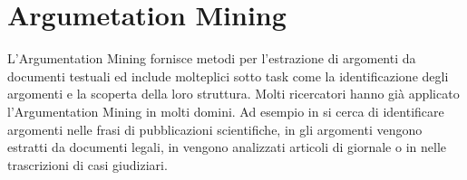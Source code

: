 \section{Argumetation Mining}
L'Argumentation Mining fornisce metodi per l'estrazione di argomenti da documenti testuali ed include molteplici sotto task come la identificazione degli argomenti e la scoperta della loro struttura. Molti ricercatori hanno già applicato l'Argumentation Mining in molti domini. Ad esempio in \cite{teufel1999annotation} si cerca di identificare argomenti nelle frasi di pubblicazioni scientifiche, in \cite{moens2007automatic} gli argomenti vengono estratti da documenti legali, in \cite{feng2011classifying} vengono analizzati articoli di giornale o in \cite{florou2013argument} nelle trascrizioni di casi giudiziari.
